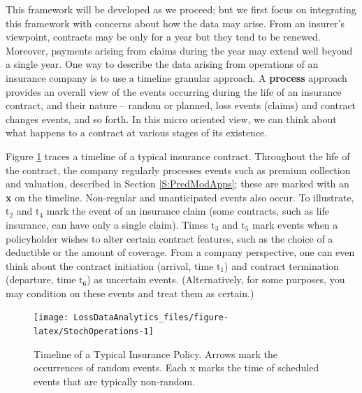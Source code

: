 \documentclass[]{book}
\theoremstyle{definition}
\theoremstyle{definition}
\theoremstyle{definition}
\theoremstyle{remark}
\begin{document}
This framework will be developed as we proceed; but we first focus on
integrating this framework with concerns about how the data may arise.
From an insurer's viewpoint, contracts may be only for a year but they
tend to be renewed. Moreover, payments arising from claims during the
year may extend well beyond a single year. One way to describe the data
arising from operations of an insurance company is to use a timeline
granular approach. A \textbf{process} approach provides an overall view
of the events occurring during the life of an insurance contract, and
their nature -- random or planned, loss events (claims) and contract
changes events, and so forth. In this micro oriented view, we can think
about what happens to a contract at various stages of its existence.

Figure \ref{fig:StochOperations} traces a timeline of a typical
insurance contract. Throughout the life of the contract, the company
regularly processes events such as premium collection and valuation,
described in Section \ref{S:PredModApps}; these are marked with an
\textbf{x} on the timeline. Non-regular and unanticipated events also
occur. To illustrate, \(\mathrm{t}_2\) and \(\mathrm{t}_4\) mark the
event of an insurance claim (some contracts, such as life insurance, can
have only a single claim). Times \(\mathrm{t}_3\) and \(\mathrm{t}_5\)
mark events when a policyholder wishes to alter certain contract
features, such as the choice of a deductible or the amount of coverage.
From a company perspective, one can even think about the contract
initiation (arrival, time \(\mathrm{t}_1\)) and contract termination
(departure, time \(\mathrm{t}_6\)) as uncertain events. (Alternatively,
for some purposes, you may condition on these events and treat them as
certain.)





\begin{figure}

{\centering \texttt{[image: LossDataAnalytics\_files/figure-latex/StochOperations-1]} 

}

\caption{Timeline of a Typical Insurance Policy. Arrows
mark the occurrences of random events. Each x marks the time of
scheduled events that are typically non-random.}\label{fig:StochOperations}
\end{figure}

\hypertarget{surveyElement11}{}

\hypertarget{surveyResult11}{}
\end{document}
